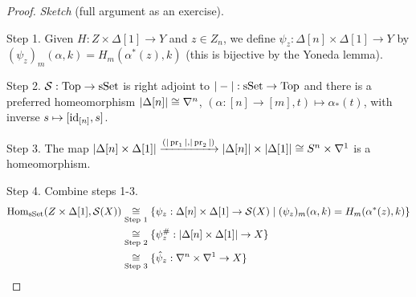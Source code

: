 \begin{proof}
\textit{Sketch} (full argument as an exercise).

Step 1. Given $H:Z\times\Delta[1]\to Y$ and $z\in Z_n$, we define $\psi_z:\Delta[n]\times\Delta[1]\to Y$ by $(\psi_z)_m(\alpha,k)=H_m(\alpha^*(z),k)$ (this is bijective by the Yoneda lemma).

Step 2. $\mathcal{S}:{\mathrm{Top}}\to{\mathrm{sSet}}$ is right adjoint to $|-|:{\mathrm{sSet}}\to{\mathrm{Top}}$ and there is a preferred homeomorphism $|\Delta[n]|\cong\nabla^n$, $(\alpha:[n]\to[m],t)\mapsto\alpha_*(t)$, with inverse $s\mapsto[\operatorname{id}_{[n]},s]$.

Step 3. The map $|\Delta[n]\times\Delta[1]|\xrightarrow{(|\operatorname{pr}_1|,|\operatorname{pr}_2|)}|\Delta[n]|\times|\Delta[1]|\cong S^n\times\nabla^{1}$ is a homeomorphism.

Step 4. Combine steps 1-3.
\begin{align*}
    \operatorname{Hom}_{\mathrm{sSet}}(Z\times\Delta[1],\mathcal{S}(X))&\underset{\text{Step 1}}{\cong}\{\psi_z:\Delta[n]\times\Delta[1]\to\mathcal{S}(X)\mid(\psi_z)_m(\alpha,k)=H_m(\alpha^*(z),k)\} \\
    &\underset{\text{Step 2}}{\cong}\{\psi_z^\#:|\Delta[n]\times\Delta[1]|\to X\} \\
    &\underset{\text{Step 3}}{\cong}\{\hat\psi_z:\nabla^n\times\nabla^{1}\to X\}
\end{align*}

\end{proof}
